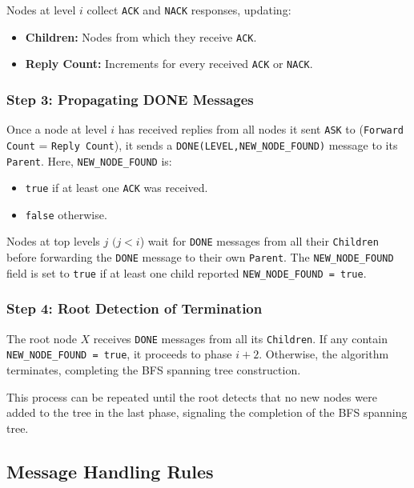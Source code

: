 Nodes at level \( i \) collect \texttt{ACK} and \texttt{NACK} responses, updating:
\begin{itemize}
    \item \textbf{Children:} Nodes from which they receive \texttt{ACK}.
    \item \textbf{Reply Count:} Increments for every received \texttt{ACK} or \texttt{NACK}.
\end{itemize}

\subsubsection{Step 3: Propagating DONE Messages}
Once a node at level \( i \) has received replies from all nodes it sent \texttt{ASK} to (\texttt{Forward Count} = \texttt{Reply Count}), it sends a \texttt{DONE(LEVEL,NEW\_NODE\_FOUND)} message to its \texttt{Parent}. Here, \texttt{NEW\_NODE\_FOUND} is:
\begin{itemize}
    \item \texttt{true} if at least one \texttt{ACK} was received.
    \item \texttt{false} otherwise.
\end{itemize}

Nodes at top levels \( j\) \((j < i \)) wait for \texttt{DONE} messages from all their \texttt{Children} before forwarding the \texttt{DONE} message to their own \texttt{Parent}. The \texttt{NEW\_NODE\_FOUND} field is set to \texttt{true} if at least one child reported \texttt{NEW\_NODE\_FOUND = true}.

\subsubsection{Step 4: Root Detection of Termination}
The root node \(X\) receives \texttt{DONE} messages from all its \texttt{Children}. If any contain \texttt{NEW\_NODE\_FOUND = true}, it proceeds to phase \( i+2 \). Otherwise, the algorithm terminates, completing the BFS spanning tree construction.

This process can be repeated until the root detects that no new nodes were added to the tree in the last phase, signaling the completion of the BFS spanning tree.

\subsection{Message Handling Rules}

